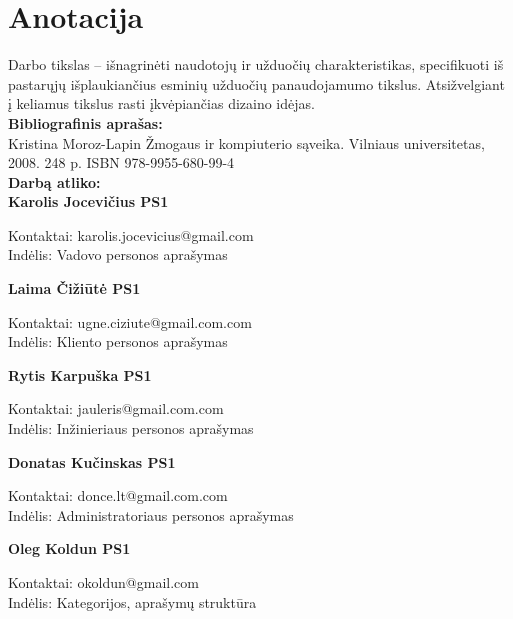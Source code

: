 

\newcommand{\anotacijaIndelis}[3]{
	\textbf{#1}
	\begin{flushleft}
	\hspace*{1cm}
	Kontaktai: #2
	\\
	\hspace*{1cm}
	Indėlis: #3
	\end{flushleft}
}

\newcommand{\anotacija}[2]{
	\textbf{#1}
	\begin{flushleft}
	\hspace*{1cm}
	Kontaktai: #2
	\end{flushleft}
}

\section*{Anotacija}

		Darbo tikslas – išnagrinėti naudotojų ir užduočių charakteristikas, specifikuoti iš pastarųjų išplaukiančius esminių užduočių panaudojamumo tikslus.
		Atsižvelgiant į keliamus tikslus rasti įkvėpiančias dizaino idėjas. \\
		
		\textbf{Bibliografinis aprašas:}\\
		Kristina Moroz-Lapin Žmogaus ir kompiuterio sąveika. Vilniaus universitetas, 2008. 248 p. ISBN 978-9955-680-99-4
		\\
		
		\textbf{Darbą atliko:}\\
		
		\anotacijaIndelis{Karolis Jocevičius PS1}{karolis.jocevicius@gmail.com}{Vadovo personos aprašymas}
		
		\anotacijaIndelis{Laima Čižiūtė PS1}{ugne.ciziute@gmail.com.com}{Kliento personos aprašymas}
		
		\anotacijaIndelis{Rytis Karpuška PS1}{jauleris@gmail.com.com}{Inžinieriaus personos aprašymas}

		\anotacijaIndelis{Donatas Kučinskas PS1}{donce.lt@gmail.com.com}{Administratoriaus personos aprašymas}

		\anotacijaIndelis{Oleg Koldun PS1}{okoldun@gmail.com}{Kategorijos, aprašymų struktūra}